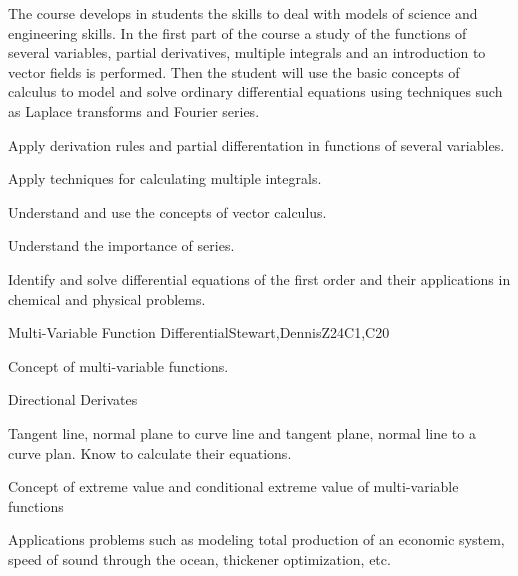 \begin{syllabus}


\begin{justification}

The course develops in students the skills to deal with models of science and engineering skills. In the first part
of the course a study of the functions of several variables, partial derivatives, multiple integrals and an
introduction to vector fields is performed. Then the student will use the basic concepts of calculus to model
and solve ordinary differential equations using techniques such as Laplace transforms and Fourier series.
\end{justification}

\begin{goals}
  \item Apply derivation rules and partial differentation in functions of several variables.
  \item Apply techniques for calculating multiple integrals.
  \item Understand and use the concepts of vector calculus.
  \item Understand the importance of series.
  \item Identify and solve differential equations of the first order and their applications in chemical and physical problems.
\end{goals}

\begin{outcomes} 
    \item {}  
    \item {}
\end{outcomes}

\begin{competences}  
    \item {}
    \item {}
\end{competences}

\begin{unit}{Multi-Variable Function Differential}{}{Stewart,DennisZ}{24}{C1,C20}
   \begin{topics}      
    \item Concept of multi-variable functions.
    \item Directional Derivates
    \item Tangent line, normal plane to curve line and tangent plane, normal line to a curve plan. Know to calculate their equations.
    \item Concept of extreme value and conditional extreme value of multi-variable functions
    \item Applications problems such as modeling total production of an economic system, speed of sound through the ocean, thickener optimization, etc.
      \end{topics}


\end{unit}
\end{syllabus}
